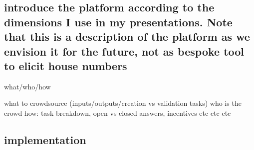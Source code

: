 \subsection{introduce the platform according to the dimensions I use in my presentations. Note that this is a description of the platform as we envision it for the future, not as bespoke tool to elicit house numbers}

what/who/how

what to crowdsource (inputs/outputs/creation vs validation tasks)
who is the crowd 
how: task breakdown, open vs closed answers, incentives etc etc etc

\subsection{implementation}